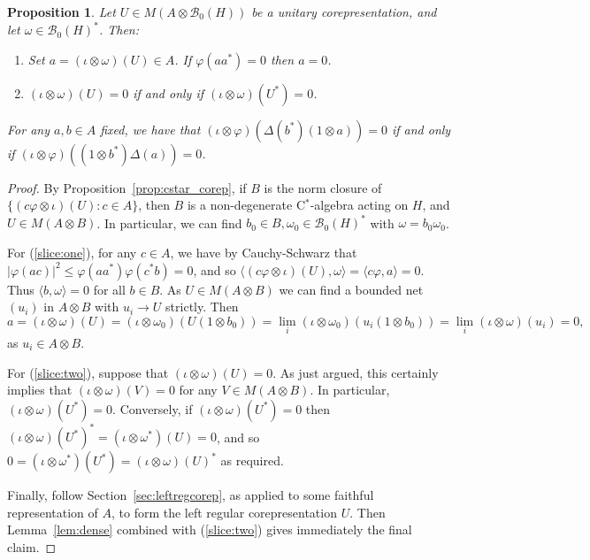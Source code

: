 \documentclass[twoside,a4paper,12pt]{article}
\theoremstyle{plain}
\newtheorem{proposition}{Proposition}[section]
\theoremstyle{definition}
\newcommand{\ip}[2]{\langle #1,#2 \rangle}
\newcommand{\mc}{\mathcal}
\begin{document}
\begin{proposition}\label{prop:slices}
Let $U\in M(A\otimes\mc B_0(H))$ be a unitary corepresentation, and let
$\omega\in\mc B_0(H)^*$.  Then:
\begin{enumerate}
\item\label{slice:one} Set $a=(\iota\otimes\omega)(U)\in A$.
If $\varphi(aa^*)=0$ then $a=0$.
\item\label{slice:two} $(\iota\otimes\omega)(U)=0$ if and only if
$(\iota\otimes\omega)(U^*)=0$.
\end{enumerate}
For any $a,b\in A$ fixed, we have that
$(\iota\otimes\varphi)(\Delta(b^*)(1\otimes a))=0$ if and only if
$(\iota\otimes\varphi)((1\otimes b^*)\Delta(a))=0$.
\end{proposition}
\begin{proof}
By Proposition~\ref{prop:cstar_corep}, if $B$ is the norm closure of
$\{ (c \varphi\otimes\iota)(U) : c\in A \}$, then $B$ is a non-degenerate
C$^*$-algebra acting on $H$, and $U\in M(A\otimes B)$.  In particular,
we can find $b_0\in B,\omega_0\in\mc B_0(H)^*$ with $\omega=b_0\omega_0$.

For (\ref{slice:one}), for any $c\in A$, we have by Cauchy-Schwarz that
$|\varphi(ac)|^2 \leq \varphi(aa^*) \varphi(c^*b)=0$, and so
$\ip{(c \varphi\otimes\iota)(U)}{\omega} = \ip{c\varphi}{a} = 0$.
Thus $\ip{b}{\omega}=0$ for all $b\in B$.  As $U\in M(A\otimes B)$ we
can find a bounded net $(u_i)$ in $A\otimes B$ with $u_i\rightarrow U$
strictly.  Then
\[ a = (\iota\otimes\omega)(U) = (\iota\otimes\omega_0)(U(1\otimes b_0))
= \lim_i (\iota\otimes\omega_0)(u_i(1\otimes b_0))
= \lim_i (\iota\otimes\omega)(u_i) = 0, \]
as $u_i\in A\otimes B$.

For (\ref{slice:two}), suppose that $(\iota\otimes\omega)(U)=0$.  As just
argued, this certainly implies that $(\iota\otimes\omega)(V)=0$ for any
$V\in M(A\otimes B)$.  In particular, $(\iota\otimes\omega)(U^*)=0$.
Conversely, if $(\iota\otimes\omega)(U^*)=0$ then $(\iota\otimes\omega)(U^*)^*
= (\iota\otimes\omega^*)(U) = 0$, and so $0=(\iota\otimes\omega^*)(U^*)
= (\iota\otimes\omega)(U)^*$ as required.

Finally, follow Section~\ref{sec:leftregcorep},
as applied to some faithful representation of $A$, to form the
left regular corepresentation $U$.  Then Lemma~\ref{lem:dense} combined
with (\ref{slice:two}) gives immediately the final claim.
\end{proof}
\end{document}
